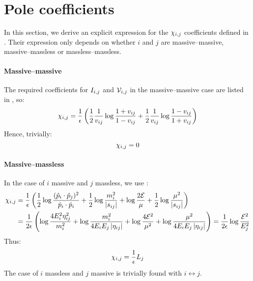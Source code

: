 \section{Pole coefficients}
\label{sec:poles}

In this section, we derive an explicit expression for the $ \chi_{i,j} $ coefficients defined in . Their expression only depends on whether $ i $ and $ j $ are massive--massive, massive--massless or massless--massless.

\paragraph{Massive--massive}

The required coefficients for $ I_{i,j} $ and $ \mathcal{V}_{i,j} $ in the massive--massive case are listed in , so:
\begin{equation*}
  \chi_{i,j} = \frac{1}{\epsilon} \left( \frac{1}{2} \frac{1}{v_{ij}} \log \frac{1 + v_{ij}}{1 - v_{ij}} + \frac{1}{2} \frac{1}{v_{ij}} \log \frac{1 - v_{ij}}{1 + v_{ij}} \right)
\end{equation*}
Hence, trivially:
\begin{equation}
  \chi_{i,j} = 0
  \label{eq:ci-mm}
\end{equation}

\paragraph{Massive--massless}

In the case of $ i $ massive and $ j $ massless, we use :
\begin{equation*}
  \begin{split}
    \chi_{i,j}
    & = \frac{1}{\epsilon} \left( \frac{1}{2} \log \frac{(\hat{p}_i \cdot \hat{p}_j)^2}{\hat{p}_i \cdot \hat{p}_i} + \frac{1}{2} \log \frac{m_i^2}{\left\lvert s_{ij}\right\rvert} + \log \frac{2\mathcal{E}}{\mu} + \frac{1}{2} \log \frac{\mu^2}{\left\lvert s_{ij}\right\rvert} \right) \\
    & = \frac{1}{2\epsilon} \left( \log \frac{4 E_i^2 \eta_{ij}^2}{m_i^2} + \log \frac{m_i^2}{4 E_i E_j \left\lvert\eta_{ij}\right\rvert} + \log \frac{4\mathcal{E}^2}{\mu^2} + \log \frac{\mu^2}{4 E_i E_j \left\lvert\eta_{ij}\right\rvert} \right) = \frac{1}{2\epsilon} \log \frac{\mathcal{E}^2}{E_j^2}
  \end{split}
\end{equation*}
Thus:
\begin{equation}
  \chi_{i,j} = \frac{1}{\epsilon} L_j
  \label{eq:ci-mnm}
\end{equation}
The case of $ i $ massless and $ j $ massive is trivially found with $ i \leftrightarrow j $.

